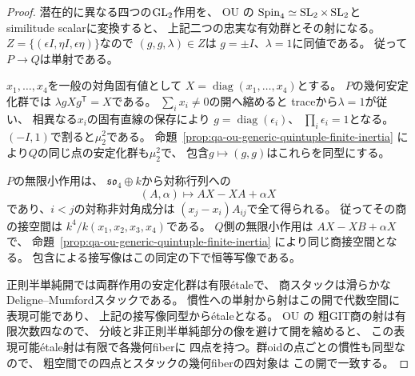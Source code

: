 \begin{proof}
潜在的に異なる四つの$\operatorname{GL}_2$作用を、
OU \cite[\S3, (3.6)--(3.10)]{OU2014}の
$\operatorname{Spin}_4\simeq\operatorname{SL}_2\times\operatorname{SL}_2$と
similitude scalarに変換すると、
上記二つの忠実な有効群とその射になる。
$Z=\{(\epsilon I,\eta I,\epsilon\eta)\}$なので
$(g,g,\lambda)\in Z$は
$g=\pm I$、$\lambda=1$に同値である。
従って$P\to Q$は単射である。

$x_1,\ldots,x_4$を一般の対角固有値として
$X=\operatorname{diag}(x_1,\ldots,x_4)$とする。
$P$の幾何安定化群では
$\lambda gXg^{\mathsf T}=X$である。
$\sum_i x_i\ne0$の開へ縮めると
traceから$\lambda=1$が従い、
相異なる$x_i$の固有直線の保存により
$g=\operatorname{diag}(\epsilon_i)$、
$\prod_i\epsilon_i=1$となる。
$(-I,1)$で割ると$\mu_2^2$である。
命題~\ref{prop:qa-ou-generic-quintuple-finite-inertia}
により$Q$の同じ点の安定化群も$\mu_2^2$で、
包含$g\mapsto(g,g)$はこれらを同型にする。

$P$の無限小作用は、
$\mathfrak{so}_4\oplus k$から対称行列への
\[
 (A,\alpha)\longmapsto AX-XA+\alpha X
\]
であり、$i<j$の対称非対角成分は
$(x_j-x_i)A_{ij}$で全て得られる。
従ってその商の接空間は
$k^4/k(x_1,x_2,x_3,x_4)$である。
$Q$側の無限小作用は
$AX-XB+\alpha X$で、
命題~\ref{prop:qa-ou-generic-quintuple-finite-inertia}
により同じ商接空間となる。
包含による接写像はこの同定の下で恒等写像である。

正則半単純開では両群作用の安定化群は有限étaleで、
商スタックは滑らかなDeligne--Mumfordスタックである。
慣性への単射から射はこの開で代数空間に表現可能であり、
上記の接写像同型からétaleとなる。
OU \cite[Theorem 1.1(4)]{OU2014}の
粗GIT商の射は有限次数四なので、
分岐と非正則半単純部分の像を避けて開を縮めると、
この表現可能étale射は有限で各幾何fiberに
四点を持つ。群oidの点ごとの慣性も同型なので、
粗空間での四点とスタックの幾何fiberの四対象は
この開で一致する。
\end{proof}

